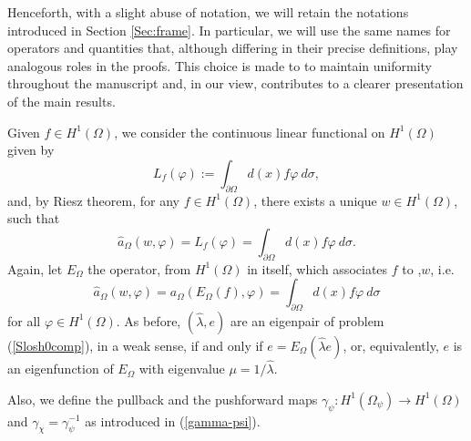 \documentclass[a4paper,reqno,11pt,oneside]{amsart}
\theoremstyle{plain}
\theoremstyle{plain}
\theoremstyle{plain}
\theoremstyle{remark}
\begin{document}
Henceforth, with a slight abuse of notation, we will retain the notations introduced in Section \ref{Sec:frame}. In particular, we will use the same names for operators and quantities that, although differing in their precise definitions, play analogous roles in the proofs. This choice  is made to to maintain uniformity throughout the manuscript and, in our view, contributes to a clearer presentation of the main results.

Given $f\in H^1(\Omega)$, we consider the continuous linear functional on $H^1(\Omega)$ given by
$$
L_f(\varphi):=\int_{\partial\Omega} d(x)f\varphi\  d\sigma,
$$
and, by Riesz theorem, for any $f\in H^1(\Omega)$, there exists a unique $w\in H^1(\Omega)$, such that 
\[
\hat a_{\Omega}(w,\varphi)=L_f (\varphi)=\int_{\partial \Omega} d(x)f\varphi\  d\sigma .
\]
Again, let $E_\Omega$  the operator, from $ H^1(\Omega)$ in itself, which associates $f$ to ,$w$, i.e. 
\begin{equation}\label{eq:Eusimp}
\hat  a_{\Omega}(w,\varphi)=a_{\Omega}(E_\Omega(f),\varphi)=\int_{\partial \Omega} d(x)f\varphi\  d\sigma 
\end{equation}
for all $\varphi \in H^1 (\Omega)$. As before,  $(\hat \lambda, e)$ are an eigenpair of problem (\ref{Slosh0comp}), in a weak sense, if and only if $e=E_\Omega(\hat \lambda e)$, or, equivalently, $e$ is an eigenfunction of $E_\Omega$ with eigenvalue $\mu=1/\hat \lambda$.

Also, we define the pullback and the pushforward maps $\gamma_\psi:H^1(\Omega_{\psi})\rightarrow H^1(\Omega)$ and $\gamma_ \chi=\gamma_\psi^{-1}$ as introduced in   (\ref{gamma-psi}).
\end{document}
